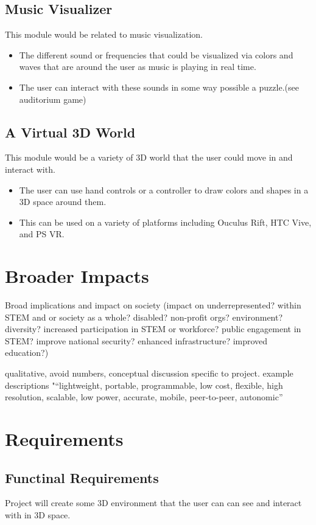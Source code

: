 \documentclass[a4paper,10pt]{article}
\begin{document}
     \subsection{Music Visualizer}
     This module would be related to music visualization. 
     \begin{itemize}
     \item The different sound or frequencies that could be visualized via colors and waves that are around the user as music is playing in real time.
     \item The user can interact with these sounds in some way possible a puzzle.(see auditorium game)
     \end{itemize}   
     \subsection{A Virtual 3D World}
     This module would be a variety of 3D world that the user could move in and interact with. 
     \begin{itemize}
     \item The user can use hand controls or a controller to draw colors and shapes in a 3D space around them. 
     \item This can be used on a variety of platforms including Ouculus Rift, HTC Vive, and PS VR.
     \end{itemize}   


\section{Broader Impacts}
Broad implications and impact on society (impact on underrepresented? within STEM and or society as a whole? disabled? non-profit orgs? environment? diversity? increased participation in STEM or workforce? public engagement in STEM? improve national security? enhanced infrastructure? improved education?)

qualitative, avoid numbers, conceptual discussion specific to project.
example descriptions "“lightweight, portable, programmable, low cost, flexible, high resolution, scalable, low power, accurate, mobile, peer-to-peer, autonomic”


\section{Requirements}
\subsection{Functinal Requirements}
\begin{number}
\item Project will create some 3D environment that the user can can see and interact with in 3D space.
\item 
\item
\end{number}
\end{document}
